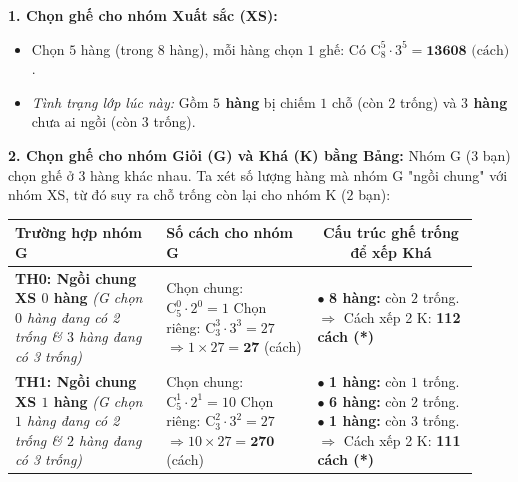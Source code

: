 \begin{ex}
{		\textbf{1. Chọn ghế cho nhóm Xuất sắc (XS):}
		\begin{itemize}
			\item Chọn $5$ hàng (trong $8$ hàng), mỗi hàng chọn $1$ ghế: Có $\mathrm{C}_8^5 \cdot 3^5 = \mathbf{13608} \text{ (cách)}$.
			\item \textit{Tình trạng lớp lúc này:} Gồm \textbf{$5$ hàng} bị chiếm $1$ chỗ (còn $2$ trống) và \textbf{$3$ hàng} chưa ai ngồi (còn $3$ trống).
		\end{itemize}
		\textbf{2. Chọn ghế cho nhóm Giỏi (G) và Khá (K) bằng Bảng:}
		Nhóm G ($3$ bạn) chọn ghế ở $3$ hàng khác nhau. Ta xét số lượng hàng mà nhóm G "ngồi chung" với nhóm XS, từ đó suy ra chỗ trống còn lại cho nhóm K ($2$ bạn):
		\begin{center}
			\renewcommand{\arraystretch}{1.5}
			\begin{tabular}{|p{0.3\linewidth}|p{0.3\linewidth}|p{0.32\linewidth}|}
				\hline
				\centering\textbf{Trường hợp nhóm G} & \centering\textbf{Số cách cho nhóm G} & \multicolumn{1}{c|}{\textbf{Cấu trúc ghế trống để xếp Khá}} \\ \hline
				\textbf{TH0: Ngồi chung XS $0$ hàng} \newline
				\textit{(G chọn $0$ hàng đang có 2 trống \newline \& $3$ hàng đang có 3 trống)}
				& Chọn chung: $\mathrm{C}_5^0 \cdot 2^0 = 1$ \newline
				Chọn riêng: $\mathrm{C}_3^3 \cdot 3^3 = 27$ \newline
				$\Rightarrow 1 \times 27 = \mathbf{27}$ (cách)
				& $\bullet$ \textbf{8 hàng:} còn $2$ trống. \newline
				$\Rightarrow$ Cách xếp 2 K: \textbf{112 cách (*)} \\ \hline
				\textbf{TH1: Ngồi chung XS $1$ hàng} \newline
				\textit{(G chọn $1$ hàng đang có 2 trống \newline \& $2$ hàng đang có 3 trống)}
				& Chọn chung: $\mathrm{C}_5^1 \cdot 2^1 = 10$ \newline
				Chọn riêng: $\mathrm{C}_3^2 \cdot 3^2 = 27$ \newline
				$\Rightarrow 10 \times 27 = \mathbf{270}$ (cách)
				& $\bullet$ \textbf{1 hàng:} còn $1$ trống. \newline
				$\bullet$ \textbf{6 hàng:} còn $2$ trống. \newline
				$\bullet$ \textbf{1 hàng:} còn $3$ trống. \newline
				$\Rightarrow$ Cách xếp 2 K: \textbf{111 cách (*)} \\ \hline

\end{tabular}
\end{center}}
\end{ex}
